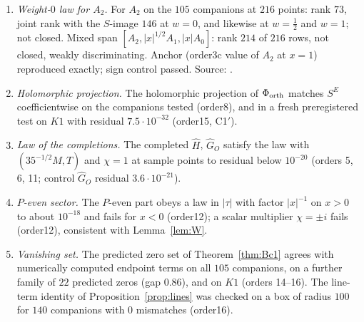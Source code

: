 \begin{enumerate}[label=D.\arabic*,leftmargin=3em]
\item\label{catB:4b} \emph{Weight-$0$ law for $A_2$.} For $A_2$ on the $105$ companions at $216$ points: rank $73$, joint rank with the $S$-image $146$ at $w=0$,
and likewise at $w=\frac12$ and $w=1$; not closed. Mixed span $[A_2,|x|^{1/2}A_1,|x|A_0]$: rank $214$ of $216$ rows, not closed, weakly
discriminating. Anchor (order3c value of $A_2$ at $x=1$) reproduced exactly; sign control passed. Source: .
\item\label{catB:sh1} \emph{Holomorphic projection.} The holomorphic projection of $\Phi_{\rm orth}$ matches $S^E$ coefficientwise on the companions tested (order8), and in a
fresh preregistered test on $K1$ with residual $7.5\cdot10^{-32}$ (order15, C1$'$).
\item\label{catB:sh2} \emph{Law of the completions.} The completed $\widehat H$, $\widehat G_O$ satisfy the law with $(35^{-1/2}M,T)$ and $\chi=1$ at sample points to residual
below $10^{-20}$ (orders 5, 6, 11; control $\widehat G_O$ residual $3.6\cdot10^{-21}$).
\item\label{catB:sh3} \emph{$P$-even sector.} The $P$-even part obeys a law in $|\tau|$ with factor $|x|^{-1}$ on $x>0$ to about $10^{-18}$ and fails for $x<0$ (order12); a
scalar multiplier $\chi=\pm i$ fails (order12), consistent with Lemma~\ref{lem:W}.
\item\label{catB:sh4} \emph{Vanishing set.} The predicted zero set of Theorem~\ref{thm:Bc1} agrees with numerically computed endpoint terms on all $105$ companions, on a further
family of $22$ predicted zeros (gap $0.86$), and on $K1$ (orders 14--16). The line-term identity of Proposition~\ref{prop:lines} was checked on a box of radius $100$ for
$140$ companions with $0$ mismatches (order16).
\end{enumerate}
